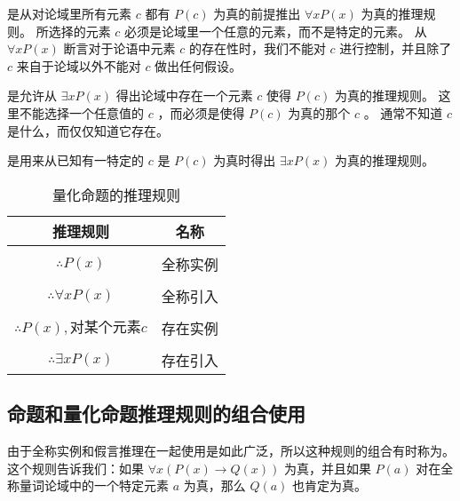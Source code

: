 {{        是从对论域里所有元素 $c$ 都有 $P(c)$ 为真的前提推出 $\forall x P(x)$ 为真的推理规则。
        所选择的元素 $c$ 必须是论域里一个任意的元素，而不是特定的元素。
        从 $\forall x P(x)$ 断言对于论语中元素 $c$ 的存在性时，我们不能对 $c$ 进行控制，并且除了 $c$ 来自于论域以外不能对 $c$ 做出任何假设。

        是允许从 $\exists x P(x)$ 得出论域中存在一个元素 $c$ 使得 $P(c)$ 为真的推理规则。
        这里不能选择一个任意值的 $c$ ，而必须是使得 $P(c)$ 为真的那个 $c$ 。
        通常不知道 $c$ 是什么，而仅仅知道它存在。

        是用来从已知有一特定的 $c$ 是 $P(c)$ 为真时得出 $\exists x P(x)$ 为真的推理规则。

        \begin{table}[htb]
            \centering

            \begin{tabular}{c|c}
                \hline
                推理规则 & 名称 \\
                \hline
                \makecell{$\underline{\forall x P(x)}$ \\ $\therefore P(x)$} & 全称实例 \\
                \hline
                \makecell{$\underline{P(c), \text{任意}c}$ \\ $\therefore \forall x P(x)$} & 全称引入 \\
                \hline
                \makecell{$\underline{\exists x P(x)}$ \\ $\therefore P(x), \text{对某个元素}c$} & 存在实例 \\
                \hline
                \makecell{$\underline{P(x), \text{对某个元素}c}$ \\ $\therefore \exists x P(x)$} & 存在引入 \\
                \hline
            \end{tabular}

            \caption{量化命题的推理规则}
        \end{table}
    }

    \subsection{命题和量化命题推理规则的组合使用}
    {
        由于全称实例和假言推理在一起使用是如此广泛，所以这种规则的组合有时称为。
        这个规则告诉我们：如果 $\forall x (P(x) \rightarrow Q(x))$ 为真，并且如果 $P(a)$ 对在全称量词论域中的一个特定元素 $a$ 为真，那么 $Q(a)$ 也肯定为真。
        
}}
